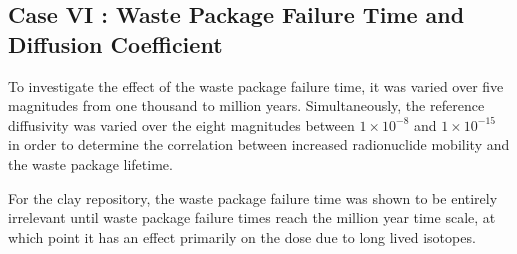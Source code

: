 
\subsection{Case VI : Waste Package Failure Time and Diffusion Coefficient}

To investigate the effect of the waste package failure time, it was varied over 
five magnitudes from one thousand to million years. Simultaneously, the reference 
diffusivity was varied over the eight magnitudes between $1\times10^{-8}$ and 
$1\times10^{-15}$ in order to determine the correlation between increased 
radionuclide mobility and the waste package lifetime. 


For the clay repository, the waste package failure time was shown to be entirely 
irrelevant until waste package failure times reach the million year time scale, 
at which point it has an effect primarily on the dose due to long lived 
isotopes. 


